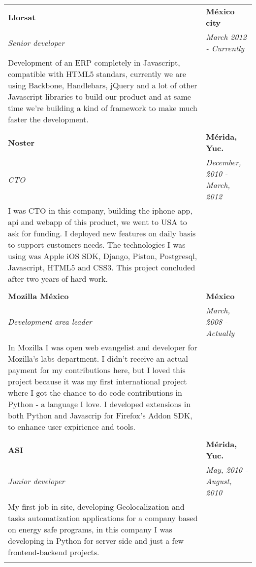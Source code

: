 \begin{tabularx}{\textwidth}{@{\extracolsep{\fill}} p{10cm} p{6.5cm} }
  \textbf{Llorsat} & \textbf{México city} \\
  \textit{Senior developer} & \textit{March 2012 - Currently} \\
  Development of an ERP completely in Javascript, compatible with HTML5 standars, currently we are using Backbone, Handlebars, jQuery and a lot of other Javascript libraries to build our product and at same time we're building a kind of framework to make much faster the development. & \\
  & \\
  \textbf{Noster} & \textbf{Mérida, Yuc.} \\
  \textit{CTO} & \textit{December, 2010 - March, 2012} \\
  I was CTO in this company, building the iphone app, api and webapp of this product, we went to USA to ask for funding.  I deployed new features on daily basis to support customers needs. The technologies I was using was Apple iOS SDK, Django, Piston, Postgresql, Javascript, HTML5 and CSS3. This project concluded after two years of hard work.& \\
  & \\
  \textbf{Mozilla México} & \textbf{México} \\
  \textit{Development area leader} & \textit{March, 2008 - Actually} \\
  In Mozilla I was open web evangelist and developer for Mozilla's labs department. I didn’t receive an actual payment for my contributions here, but I loved this project because it was my first international project where I got the chance to do code contributions in Python - a language I love. I developed extensions in both Python and Javascrip for Firefox's Addon SDK, to enhance user expirience and tools. & \\
  & \\
  \textbf{ASI} & \textbf{Mérida, Yuc.} \\
  \textit{Junior developer} & \textit{May, 2010 - August, 2010} \\
  My first job in site, developing Geolocalization and tasks automatization applications for a company based on energy safe programs, in this company I was developing in Python for server side and just a few frontend-backend projects. & \\
  & \\
\end{tabularx}
\linebreak
